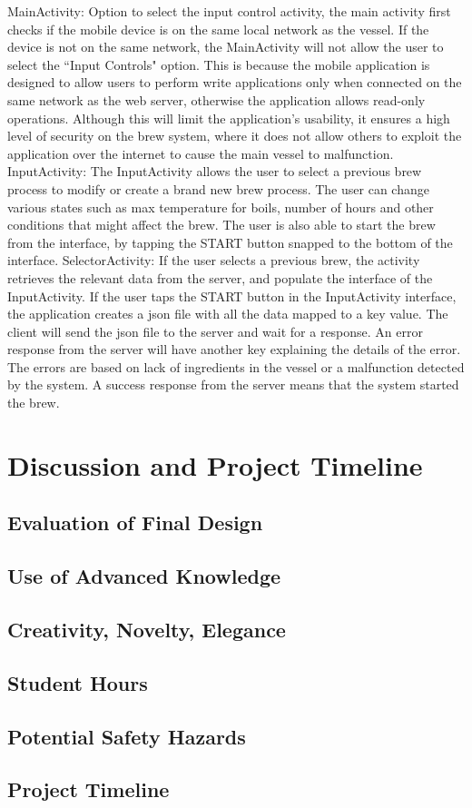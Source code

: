 \documentclass{article}
\begin{document}
MainActivity: Option to select the input control activity, the main activity first checks if the mobile device is on the same local network as the vessel. If the device is not on the same network, the MainActivity will not allow the user to select the ``Input Controls" option. This is because the mobile application is designed to allow users to perform write applications only when connected on the same network as the web server, otherwise the application allows read-only operations. Although this will limit the application's usability, it ensures a high level of security on the brew system, where it does not allow others to exploit the application over the internet to cause the main vessel to malfunction. 
InputActivity: The InputActivity allows the user to select a previous brew process to modify or create a brand new brew process. The user can change various states such as max temperature for boils, number of hours and other conditions that might affect the brew. The user is also able to start the brew from the interface, by tapping the START button snapped to the bottom of the interface.
SelectorActivity: If the user selects a previous brew, the activity retrieves the relevant data from the server, and populate the interface of the InputActivity.
If the user taps the START button in the InputActivity interface, the application creates a \gls{json} file with all the data mapped to a key value. The client will send the \gls{json} file to the server and wait for a response. An error response from the server will have another key explaining the details of the error. The errors are based on lack of ingredients in the vessel or a malfunction detected by the system. A success response from the server means that the system started the brew.

\section{Discussion and Project Timeline}
\subsection{Evaluation of Final Design}
\subsection{Use of Advanced Knowledge}
\subsection{Creativity, Novelty, Elegance}
\subsection{Student Hours}
\subsection{Potential Safety Hazards}
\subsection{Project Timeline}

\pagebreak
\printglossary[type=acronym]
\printglossary[type=beer]
\printglossary[type=technical]

{}

\end{document}
